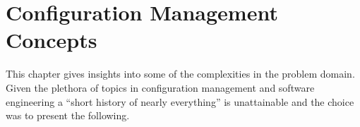 \chapter{Configuration Management Concepts}

	\normalsize
	{
		This chapter gives insights into some of the complexities in the problem domain. 
		Given the plethora of topics in configuration management and software engineering
		a ``short history of nearly everything'' is unattainable and the choice was to present the following. 
	}

	


